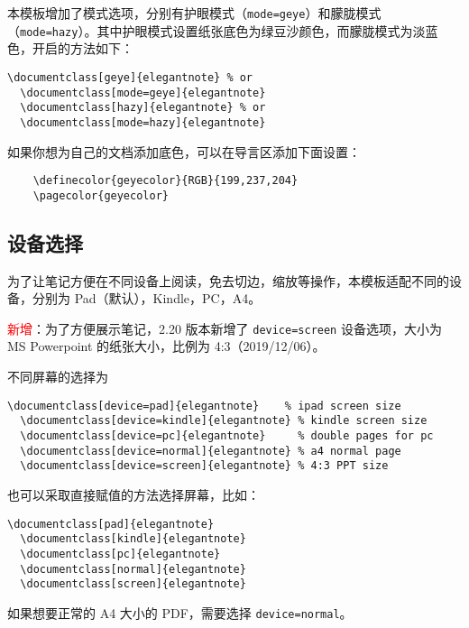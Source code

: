 \documentclass[cn,hazy,blue,14pt,screen]{elegantnote}
\begin{document}
本模板增加了模式选项，分别有护眼模式（\lstinline{mode=geye}）和朦胧模式（\lstinline{mode=hazy}）。其中护眼模式设置纸张底色为绿豆沙颜色，而朦胧模式为淡蓝色，开启的方法如下：
\begin{lstlisting}[frame=none]  
  \documentclass[geye]{elegantnote} % or
  \documentclass[mode=geye]{elegantnote}
  \documentclass[hazy]{elegantnote} % or
  \documentclass[mode=hazy]{elegantnote}
\end{lstlisting}

\begin{remark}
  如果你想为自己的文档添加底色，可以在导言区添加下面设置：
  \begin{lstlisting}
    \definecolor{geyecolor}{RGB}{199,237,204}
    \pagecolor{geyecolor}
  \end{lstlisting}
\end{remark}


\subsection{设备选择}

为了让笔记方便在不同设备上阅读，免去切边，缩放等操作，本模板适配不同的设备，分别为 Pad（默认），Kindle，PC，A4。

\textcolor{red}{\kaishu 新增}：为了方便展示笔记，2.20 版本新增了 \lstinline{device=screen} 设备选项，大小为 MS Powerpoint 的纸张大小，比例为 4:3（2019/12/06）。

不同屏幕的选择为
\begin{lstlisting}[frame=none]  
  \documentclass[device=pad]{elegantnote}    % ipad screen size
  \documentclass[device=kindle]{elegantnote} % kindle screen size
  \documentclass[device=pc]{elegantnote}     % double pages for pc 
  \documentclass[device=normal]{elegantnote} % a4 normal page
  \documentclass[device=screen]{elegantnote} % 4:3 PPT size
\end{lstlisting}
\begin{note}
也可以采取直接赋值的方法选择屏幕，比如：
\end{note}
\begin{lstlisting}[frame=none]  
  \documentclass[pad]{elegantnote}
  \documentclass[kindle]{elegantnote}
  \documentclass[pc]{elegantnote}
  \documentclass[normal]{elegantnote}
  \documentclass[screen]{elegantnote}
\end{lstlisting}

\begin{note}
  如果想要正常的 A4 大小的 PDF，需要选择 \lstinline{device=normal}。
\end{note}
\end{document}
